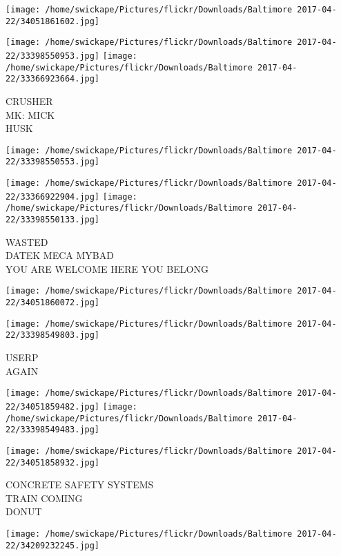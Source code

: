 \documentclass[10pt,letterpaper]{article}
\begin{document}
\texttt{[image: /home/swickape/Pictures/flickr/Downloads/Baltimore 2017-04-22/34051861602.jpg]}

\vspace{0.25in}
\texttt{[image: /home/swickape/Pictures/flickr/Downloads/Baltimore 2017-04-22/33398550953.jpg]}
\texttt{[image: /home/swickape/Pictures/flickr/Downloads/Baltimore 2017-04-22/33366923664.jpg]}

CRUSHER\\
MK: MICK\\
HUSK\\
\pagebreak

\texttt{[image: /home/swickape/Pictures/flickr/Downloads/Baltimore 2017-04-22/33398550553.jpg]}

\vspace{0.25in}
\texttt{[image: /home/swickape/Pictures/flickr/Downloads/Baltimore 2017-04-22/33366922904.jpg]}
\texttt{[image: /home/swickape/Pictures/flickr/Downloads/Baltimore 2017-04-22/33398550133.jpg]}

WASTED\\
DATEK MECA MYBAD\\
YOU ARE WELCOME HERE YOU BELONG\\
\pagebreak

\texttt{[image: /home/swickape/Pictures/flickr/Downloads/Baltimore 2017-04-22/34051860072.jpg]}

\vspace{0.25in}
\texttt{[image: /home/swickape/Pictures/flickr/Downloads/Baltimore 2017-04-22/33398549803.jpg]}

USERP\\
AGAIN\\
\pagebreak

\texttt{[image: /home/swickape/Pictures/flickr/Downloads/Baltimore 2017-04-22/34051859482.jpg]}
\texttt{[image: /home/swickape/Pictures/flickr/Downloads/Baltimore 2017-04-22/33398549483.jpg]}

\texttt{[image: /home/swickape/Pictures/flickr/Downloads/Baltimore 2017-04-22/34051858932.jpg]}

CONCRETE SAFETY SYSTEMS\\
TRAIN COMING\\
DONUT\\
\pagebreak

\texttt{[image: /home/swickape/Pictures/flickr/Downloads/Baltimore 2017-04-22/34209232245.jpg]}
\end{document}
